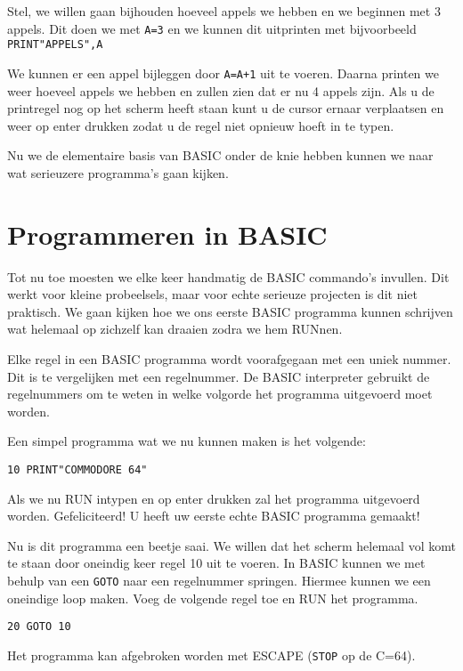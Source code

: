 \documentclass{article}
\begin{document}
Stel, we willen gaan bijhouden hoeveel appels we hebben en we beginnen met 3 appels.
Dit doen we met \verb:A=3: en we kunnen dit uitprinten met bijvoorbeeld \verb:PRINT"APPELS",A:

We kunnen er een appel bijleggen door \verb:A=A+1: uit te voeren.
Daarna printen we weer hoeveel appels we hebben en zullen zien dat er nu 4 appels zijn.
Als u de printregel nog op het scherm heeft staan kunt u de cursor ernaar verplaatsen en weer op enter drukken zodat u de regel niet opnieuw hoeft in te typen.

Nu we de elementaire basis van BASIC onder de knie hebben kunnen we naar wat serieuzere programma's gaan kijken.

\section{Programmeren in BASIC}

Tot nu toe moesten we elke keer handmatig de BASIC commando's invullen.
Dit werkt voor kleine probeelsels, maar voor echte serieuze projecten is dit niet praktisch.
We gaan kijken hoe we ons eerste BASIC programma kunnen schrijven wat helemaal op zichzelf kan draaien zodra we hem RUNnen.

Elke regel in een BASIC programma wordt voorafgegaan met een uniek nummer.
Dit is te vergelijken met een regelnummer.
De BASIC interpreter gebruikt de regelnummers om te weten in welke volgorde het programma uitgevoerd moet worden.

Een simpel programma wat we nu kunnen maken is het volgende:

\begin{lstlisting}
10 PRINT"COMMODORE 64"
\end{lstlisting}

Als we nu RUN intypen en op enter drukken zal het programma uitgevoerd worden.
Gefeliciteerd! U heeft uw eerste echte BASIC programma gemaakt!

Nu is dit programma een beetje saai.
We willen dat het scherm helemaal vol komt te staan door oneindig keer regel 10 uit te voeren.
In BASIC kunnen we met behulp van een \verb:GOTO: naar een regelnummer springen.
Hiermee kunnen we een oneindige loop maken.
Voeg de volgende regel toe en RUN het programma.

\begin{lstlisting}
20 GOTO 10
\end{lstlisting}

Het programma kan afgebroken worden met ESCAPE (\verb:STOP: op de C=64).
\end{document}
